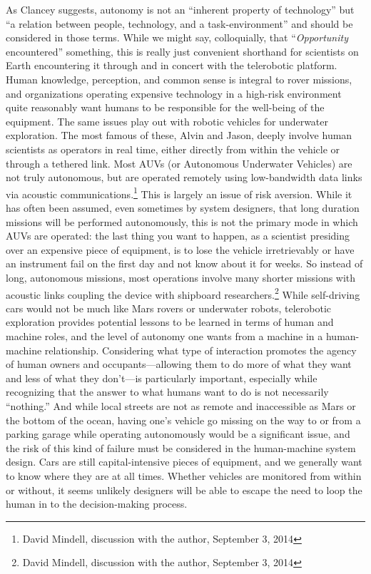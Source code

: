 As Clancey suggests, autonomy is not an ``inherent property of
technology'' but ``a relation between people, technology, and a
task-environment'' and should be considered in those terms\cite[p.
  119]{???-clancey}. While we might say, colloquially, that
``\emph{Opportunity} encountered'' something,\cite[p. 8]{???-clancey} this
is really just convenient shorthand for scientists on Earth encountering it
through and in concert with the telerobotic platform. Human knowledge,
perception, and common sense is integral to rover missions, and
organizations operating expensive 
technology in a high-risk environment quite reasonably want humans to
be responsible
for the well-being of the equipment. The same issues play out with
robotic vehicles for underwater exploration. The most famous of these,
Alvin and Jason, deeply involve human scientists as operators in real
time, either directly from within the vehicle or through a tethered
link.\cite{???} Most AUVs (or Autonomous Underwater Vehicles) are not
truly autonomous, but are operated remotely using low-bandwidth data
links via acoustic communications.\footnote{David Mindell, discussion
  with the author, September 3, 2014} This is largely an issue of risk
aversion. While it has often been assumed, even sometimes by system
designers, that long duration missions will be performed autonomously,
this is not the primary mode in which AUVs are operated: the last
thing you want to happen, as a scientist presiding over an expensive
piece of equipment, is to lose the vehicle irretrievably or have an
instrument fail on the first day and not know about it for weeks. So
instead of long, autonomous missions, most operations involve many
shorter missions with acoustic links coupling the device with
shipboard researchers.\footnote{David Mindell, discussion with the
  author, September 3, 2014} While self-driving cars would not
be much like Mars rovers or underwater robots, telerobotic exploration
provides potential lessons
to be learned in terms of human and machine roles, and the level of
autonomy one wants from a machine in a human-machine relationship.
Considering what type of interaction promotes the agency
of human owners and occupants---allowing them to do more of what they
want and less of what they don't---is particularly important,
especially while recognizing that the answer to what humans want to do
is not necessarily ``nothing.'' And while local streets are not as
remote and inaccessible as Mars or the bottom of the ocean, having
one's vehicle go missing on the way to or from a parking garage while
operating autonomously would be a significant issue, and the risk of
this kind of failure must be considered in the human-machine system
design. Cars are still capital-intensive pieces of equipment, and we
generally want to know where they are at all times. Whether vehicles
are monitored
from within or without, it seems unlikely designers will be able to
escape the need to loop the human in to the decision-making process.

